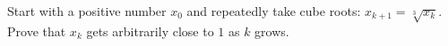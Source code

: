 Start with a positive number $x_0$ and repeatedly take cube roots: $x_{k+1}=\sqrt[3]{x_k}$. Prove that $x_k$ gets arbitrarily close to $1$ as $k$ grows.
